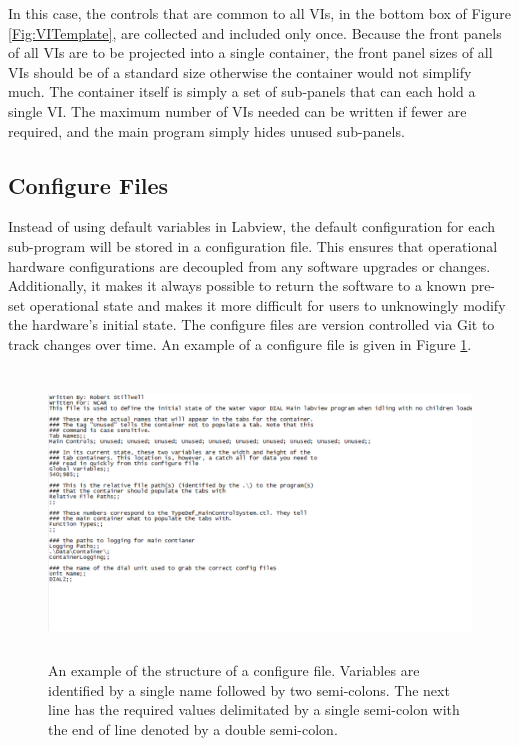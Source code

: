 In this case, the controls that are common to all VIs, in the bottom box of Figure \ref{Fig:VITemplate}, are collected and included only once. Because the front panels of all VIs are to be projected into a single container, the front panel sizes of all VIs should be of a standard size otherwise the container would not simplify much. The container itself  is simply a set of sub-panels that can each hold a single VI. The maximum number of VIs needed can be written if fewer are required, and the main program simply hides unused sub-panels. 

\subsection{Configure Files}
Instead of using default variables in Labview, the default configuration for each sub-program will be stored in a configuration file. This ensures that operational hardware configurations are decoupled from any software upgrades or changes. Additionally, it makes it always possible to return the software to a known pre-set operational state and makes it more difficult for users to unknowingly modify the hardware's initial state. The configure files are version controlled via Git to track changes over time. An example of a configure file is given in Figure \ref{Fig:ConfigureFile}. 

\begin{figure}[!ht]\centering
\includegraphics[height=3in]{Figures/ConfigureFileExample}
\caption{An example of the structure of a configure file. Variables are identified by a single name followed by two semi-colons. The next line has the required values delimitated by a single semi-colon with the end of line denoted by a double semi-colon.}\label{Fig:ConfigureFile}
\end{figure}

